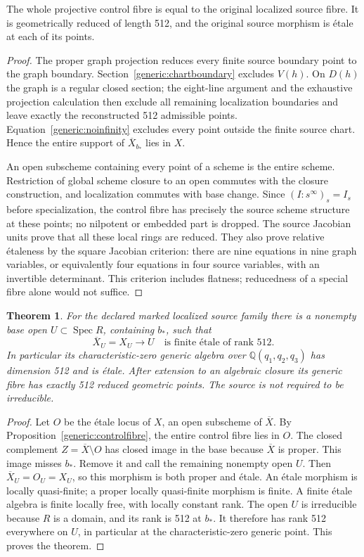 \documentclass[11pt,a4paper]{article}
\newtheorem{theorem}{Theorem}[section]
\theoremstyle{remark}\newtheorem{remark}[theorem]{Remark}
\newcommand{\Spec}{\operatorname{Spec}}\newcommand{\tr}{\operatorname{tr}}
\begin{document}
\begin{proposition}\label{generic:controlfibre}
The whole projective control fibre is equal to the original localized
source fibre. It is geometrically reduced of length 512, and the original
source morphism is \'etale at each of its points.
\end{proposition}
\begin{proof}
The proper graph projection reduces every finite source boundary point
to the graph boundary. Section~\ref{generic:chartboundary} excludes
$V(h)$. On $D(h)$ the graph is a regular closed section; the eight-line
argument and the exhaustive projection calculation then exclude all
remaining localization boundaries and leave exactly the reconstructed
512 admissible points. Equation~\eqref{generic:noinfinity} excludes
every point outside the finite source chart. Hence the entire support
of $\overline X_{b_*}$ lies in $X$.

An open subscheme containing every point of a scheme is the entire
scheme. Restriction of global scheme closure to an open commutes with
the closure construction, and localization commutes with base change.
Since $(I:s^\infty)_s=I_s$ before specialization, the control fibre
has precisely the source scheme structure at these points; no nilpotent
or embedded part is dropped. The source Jacobian units prove that all
these local rings are reduced. They also prove relative \'etaleness
by the square Jacobian criterion: there are nine equations in nine
graph variables, or equivalently four equations in four source
variables, with an invertible determinant. This criterion includes
flatness; reducedness of a special fibre alone would not suffice.
\end{proof}

\begin{theorem}\label{generic:degree}
For the declared marked localized source family there is a nonempty
base open $U\subset\Spec R$, containing $b_*$, such that
\[
 \overline X_U=X_U\longrightarrow U
 \quad\text{is finite \'etale of rank }512.
\]
In particular its characteristic-zero generic algebra over
$\mathbb Q(q_1,q_2,q_3)$ has dimension 512 and is \'etale. After
extension to an algebraic closure its generic fibre has exactly 512
reduced geometric points. The source is not required to be irreducible.
\end{theorem}
\begin{proof}
Let $O$ be the \'etale locus of $X$, an open subscheme of
$\overline X$. By Proposition~\ref{generic:controlfibre}, the entire
control fibre lies in $O$. The closed complement
$Z=\overline X\setminus O$ has closed image in the base because
$\overline X$ is proper. This image misses $b_*$. Remove it and call
the remaining nonempty open $U$. Then
$\overline X_U=O_U=X_U$, so this morphism is both proper and \'etale.
An \'etale morphism is locally quasi-finite; a proper locally
quasi-finite morphism is finite. A finite \'etale algebra is finite
locally free, with locally constant rank. The open $U$ is irreducible
because $R$ is a domain, and its rank is 512 at $b_*$. It therefore
has rank 512 everywhere on $U$, in particular at the characteristic-zero
generic point. This proves the theorem.
\end{proof}
\end{document}
